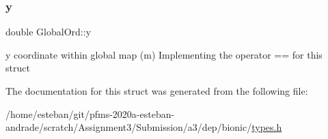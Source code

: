 \subsubsection{\texorpdfstring{y}{y}}
{\footnotesize\ttfamily double Global\+Ord\+::y}

y coordinate within global map (m) Implementing the operator \textquotesingle{}==\textquotesingle{} for this struct 

The documentation for this struct was generated from the following file\+:\begin{DoxyCompactItemize}
\item 
/home/esteban/git/pfms-\/2020a-\/esteban-\/andrade/scratch/\+Assignment3/\+Submission/a3/dep/bionic/\hyperlink{bionic_2types_8h}{types.\+h}\end{DoxyCompactItemize}
